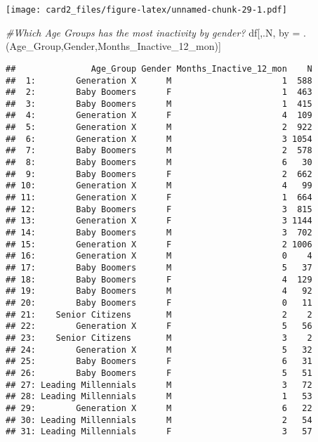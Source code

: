 \documentclass[]{article}
\newenvironment{Shaded}{\begin{snugshade}}{\end{snugshade}}
\newcommand{\CommentTok}[1]{\textcolor[rgb]{0.56,0.35,0.01}{\textit{#1}}}
\newcommand{\DecValTok}[1]{\textcolor[rgb]{0.00,0.00,0.81}{#1}}
\newcommand{\NormalTok}[1]{#1}
\newcommand{\StringTok}[1]{\textcolor[rgb]{0.31,0.60,0.02}{#1}}
\begin{document}
\texttt{[image: card2\_files/figure-latex/unnamed-chunk-29-1.pdf]}

\begin{Shaded}
\begin{Highlighting}[]
\CommentTok{#Which Age Groups has the most inactivity by gender? }
\NormalTok{df[,.N, by =}\StringTok{ }\NormalTok{.(Age_Group,Gender,Months_Inactive_}\DecValTok{12}\NormalTok{_mon)] }
\end{Highlighting}
\end{Shaded}

\begin{verbatim}
##               Age_Group Gender Months_Inactive_12_mon    N
##  1:        Generation X      M                      1  588
##  2:        Baby Boomers      F                      1  463
##  3:        Baby Boomers      M                      1  415
##  4:        Generation X      F                      4  109
##  5:        Generation X      M                      2  922
##  6:        Generation X      M                      3 1054
##  7:        Baby Boomers      M                      2  578
##  8:        Baby Boomers      M                      6   30
##  9:        Baby Boomers      F                      2  662
## 10:        Generation X      M                      4   99
## 11:        Generation X      F                      1  664
## 12:        Baby Boomers      F                      3  815
## 13:        Generation X      F                      3 1144
## 14:        Baby Boomers      M                      3  702
## 15:        Generation X      F                      2 1006
## 16:        Generation X      M                      0    4
## 17:        Baby Boomers      M                      5   37
## 18:        Baby Boomers      F                      4  129
## 19:        Baby Boomers      M                      4   92
## 20:        Baby Boomers      F                      0   11
## 21:    Senior Citizens       M                      2    2
## 22:        Generation X      F                      5   56
## 23:    Senior Citizens       M                      3    2
## 24:        Generation X      M                      5   32
## 25:        Baby Boomers      F                      6   31
## 26:        Baby Boomers      F                      5   51
## 27: Leading Millennials      M                      3   72
## 28: Leading Millennials      M                      1   53
## 29:        Generation X      M                      6   22
## 30: Leading Millennials      M                      2   54
## 31: Leading Millennials      F                      3   57

\end{verbatim}
\end{document}
